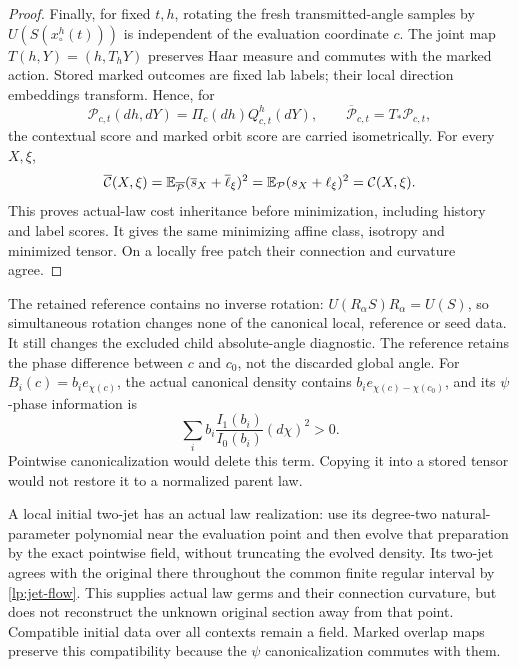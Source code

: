 \begin{proof}
Finally, for fixed $t,h$, rotating the fresh transmitted-angle samples by $U(S(x_\circ^h(t)))$ is independent of the evaluation coordinate $c$. The joint map $T(h,Y)=(h,T_hY)$ preserves Haar measure and commutes with the marked action. Stored marked outcomes are fixed lab labels; their local direction embeddings transform. Hence, for
\begin{equation}
 \mathcal P_{c,t}(dh,dY)=\Pi_c(dh)Q_{c,t}^{h}(dY),\qquad
 \overline{\mathcal P}_{c,t}=T_*\mathcal P_{c,t},
 \label{lp:actual-experiment}
\end{equation}
the contextual score and marked orbit score are carried isometrically. For every $X,\xi$,
\begin{equation}
 \overline{\mathcal C}(X,\xi)
 =\mathbb E_{\overline{\mathcal P}}(\overline s_X+\overline\ell_\xi)^2
 =\mathbb E_{\mathcal P}(s_X+\ell_\xi)^2=\mathcal C(X,\xi).
 \label{lp:cost}
\end{equation}
This proves actual-law cost inheritance before minimization, including history and label scores. It gives the same minimizing affine class, isotropy and minimized tensor. On a locally free patch their connection and curvature agree.
\end{proof}

The retained reference contains no inverse rotation: $U(R_\alpha S)R_\alpha=U(S)$, so simultaneous rotation changes none of the canonical local, reference or seed data. It still changes the excluded child absolute-angle diagnostic. The reference retains the phase difference between $c$ and $c_0$, not the discarded global angle. For $B_i(c)=b_i e_{\chi(c)}$, the actual canonical density contains $b_i e_{\chi(c)-\chi(c_0)}$, and its $\psi$-phase information is
\begin{equation}
 \sum_i b_i\frac{I_1(b_i)}{I_0(b_i)}(d\chi)^2>0.
 \label{lp:phase-information}
\end{equation}
Pointwise canonicalization would delete this term. Copying it into a stored tensor would not restore it to a normalized parent law.

A local initial two-jet has an actual law realization: use its degree-two natural-parameter polynomial near the evaluation point and then evolve that preparation by the exact pointwise field, without truncating the evolved density. Its two-jet agrees with the original there throughout the common finite regular interval by \cref{lp:jet-flow}. This supplies actual law germs and their connection curvature, but does not reconstruct the unknown original section away from that point. Compatible initial data over all contexts remain a field. Marked overlap maps preserve this compatibility because the $\psi$ canonicalization commutes with them.


